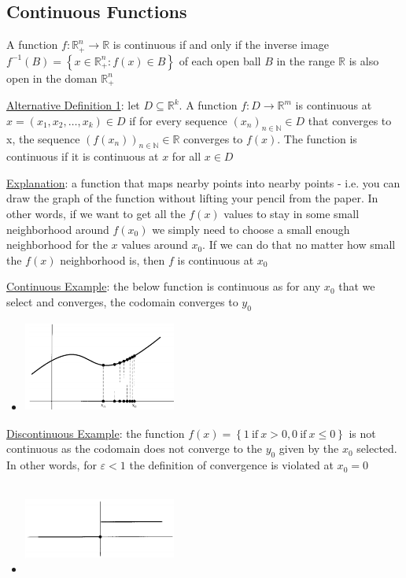 \documentclass{article}
\begin{document}
\subsection{Continuous Functions}
A function $f: \mathbb{R}_{+}^{n} \rightarrow \mathbb{R}$ is continuous if and only if the inverse image $f^{-1} (B) = \left\{ x \in \mathbb{R}_{+}^{n}: f(x) \in B \right\}$ of each open ball $B$ in the range $\mathbb{R}$ is also open in the doman $\mathbb{R}_{+}^{n}$ \par \vspace{0.3em}
  \underline{Alternative Definition 1}: let $D \subseteq \mathbb{R}^{k}$. A function $f: D \rightarrow \mathbb{R}^{m}$ is continuous at $x = (x_{1}, x_{2}, \dots, x_{k}) \in D$ if for every sequence $(x_{n})_{n \in \mathbb{N}} \in D$ that converges to x, the sequence $(f(x_{n}))_{n\in \mathbb{N}} \in \mathbb{R}$ converges to $f(x)$. The function is continuous if it is continuous at $x$ for all $x \in D$ \par
  \underline{Explanation}: a function that maps nearby points into nearby points - i.e. you can draw the graph of the function without lifting your pencil from the paper. In other words, if we want to get all the $f(x)$ values to stay in some small neighborhood around $f(x_{0})$ we simply need to choose a small enough neighborhood for the $x$ values around $x_{0}$. If we can do that no matter how small the $f(x)$ neighborhood is, then $f$ is continuous at $x_{0}$ \par
  \underline{Continuous Example}: the below function is continuous as for any $x_{0}$ that we select and converges, the codomain converges to $y_{0}$
  \begin{itemize}
    \item  \includegraphics[width=5cm, height=3cm]{pic6}
  \end{itemize}
  \par
  \underline{Discontinuous Example}: the function $f(x) = \left\{ 1 \ \text{if} \ x > 0, 0 \ \text{if} \ x \leq 0 \right\}$ is not continuous as the codomain does not converge to the $y_{0}$ given by the $x_{0}$ selected. In other words, for $\varepsilon < 1$ the definition of convergence is violated at $x_{0} = 0$
  \begin{itemize}
    \item  \includegraphics[width=5cm, height=3cm]{pic7}
  \end{itemize}
\end{document}
